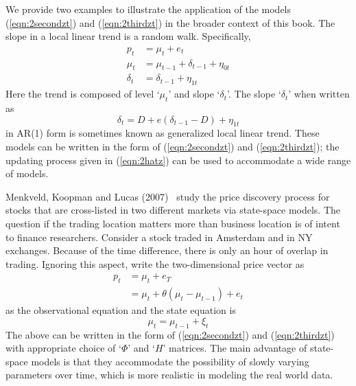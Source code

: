 We provide two examples to illustrate the application of the models (\ref{eqn:2secondzt}) and (\ref{eqn:2thirdzt}) in the broader context of this book. The slope in a local linear trend is a random walk. Specifically,
	\begin{equation}\label{eqn:randomwalk}
	\begin{split}
	p_t&= \mu_t+ e_t \\
	\mu_t&= \mu_{t-1} + \delta_{t-1} + \eta_{0t} \\
	\delta_t&=\delta_{t-1}+\eta_{1t}
	\end{split}
	\end{equation}
Here the trend is composed of level `$\mu_t$' and slope `$\delta_t$'. The slope `$\delta_t$' when written as 
	\begin{equation}\label{eqn:slopewritten}
	\delta_t= D+ e(\delta_{t-1} - D)+ \eta_{1t}
	\end{equation}
in AR(1) form is sometimes known as generalized local linear trend. These models can be written in the form of (\ref{eqn:2secondzt}) and (\ref{eqn:2thirdzt}); the updating process given in (\ref{eqn:2hatz}) can be used to accommodate a wide range of models.


Menkveld, Koopman and Lucas (2007)~\cite{menkkoop} study the price discovery process for stocks that are cross-listed in two different markets via state-space models. The question if the trading location matters more than business location is of intent to finance researchers. Consider a stock traded in Amsterdam and in NY exchanges. Because of the time difference, there is only an hour of overlap in trading. Ignoring this aspect, write the two-dimensional price vector as
	\begin{equation}
	\begin{split}
	p_t&=\mu_t + e_T \\
	&=\mu_t + \theta(\mu_t-\mu_{t-1}) + e_t
	\end{split}
	\end{equation}
as the observational equation and the state equation is
	\begin{equation}
	\mu_t= \mu_{t-1} + \xi_t
	\end{equation}
The above can be written in the form of (\ref{eqn:2secondzt}) and (\ref{eqn:2thirdzt}) with appropriate choice of `$\Phi$' and `$H$' matrices. The main advantage of state-space models is that they accommodate the possibility of slowly varying parameters over time, which is more realistic in modeling the real world data. 


